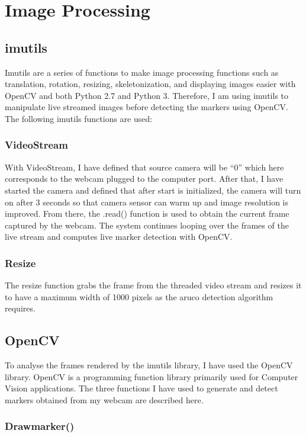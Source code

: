\documentclass[oneside,%
                    author={Malak Hajji},
                    degree={BSc},
                    title={Designing An Accessible Computational Toolkit For Students},
                  subtitle={With Mixed Visual Abilities}]{dissertation}
\begin{document}
\section{Image Processing} 
\subsection{imutils}

\noindent
Imutils are a series of functions to make image processing functions such as translation, rotation, resizing, skeletonization, and displaying images easier with OpenCV and both Python 2.7 and Python 3. Therefore, I am using imutils to manipulate live streamed images before detecting the markers using OpenCV. The following imutils functions are used:

\subsubsection{VideoStream}
With VideoStream, I have defined that source camera will be “0” which here corresponds to the webcam plugged to the computer port. After that, I have started the camera and defined that after start is initialized, the camera will turn on after 3 seconds so that camera sensor can warm up and image resolution is improved. From there, the .read() function is used to obtain the current frame captured by the webcam. The system continues looping over the frames of the live stream and computes live marker detection with 
OpenCV.

\subsubsection{Resize}
The resize function grabs the frame from the threaded video stream and resizes it to have a maximum width of 1000 pixels as the aruco detection algorithm requires.

\subsection{OpenCV}

To analyse the frames rendered by the imutils library, I have used the OpenCV library. OpenCV is a programming function library primarily used for Computer Vision applications. The three functions I have used to generate and detect markers obtained from my webcam are described here. 

\subsubsection{Drawmarker()}
\end{document}
